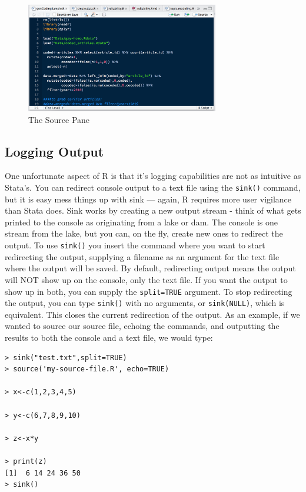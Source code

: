 \documentclass[12pt, oneside]{amsart}   	%
\begin{document}
\begin{figure}[t]
\caption{The Source Pane}
\centering
\label{fig:source}
\includegraphics[width=0.75\textwidth]{source_pane}
\end{figure}

\subsection{Logging Output}

One unfortunate aspect of R is that it's logging capabilities are not as intuitive as Stata's. You can redirect console output to a text file using the \texttt{sink()} command, but it is easy mess things up with sink --- again, R requires more user vigilance than Stata does. Sink works by creating a new output stream - think of what gets printed to the console as originating from a lake or dam. The console is one stream from the lake, but you can, on the fly, create new ones to redirect the output. To use \texttt{sink()} you insert the command where you want to start redirecting the output, supplying a filename as an argument for the text file where the output will be saved. By default, redirecting output means the output will NOT show up on the console, only the text file. If you want the output to show up in both, you can supply the \texttt{split=TRUE} argument. To stop redirecting the output, you can type \texttt{sink()} with no arguments, or \texttt{sink(NULL)}, which is equivalent. This closes the current redirection of the output. As an example, if we wanted to source our source file, echoing the commands, and outputting the results to both the console and a text file, we would type:

\begin{verbatim}
> sink("test.txt",split=TRUE)
> source('my-source-file.R', echo=TRUE)

> x<-c(1,2,3,4,5)

> y<-c(6,7,8,9,10)

> z<-x*y

> print(z)
[1]  6 14 24 36 50
> sink()
\end{verbatim}
\end{document}

